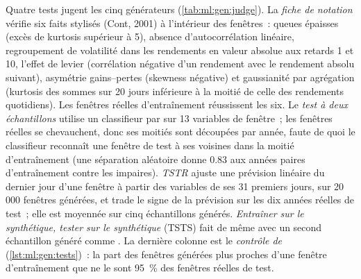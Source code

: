 Quatre tests jugent les cinq générateurs (\cref{tab:ml:gen:judge}). La \emph{fiche de notation} vérifie six faits stylisés (Cont,
2001) à l'intérieur des fenêtres~: queues épaisses (excès de kurtosis supérieur à 5), absence d'autocorrélation linéaire, regroupement de volatilité
dans les rendements en valeur absolue aux retards 1 et 10, l'effet de levier (corrélation négative d'un rendement avec le rendement absolu suivant), asymétrie gains--pertes
(skewness négative) et gaussianité par agrégation (kurtosis des sommes sur 20 jours inférieure à la moitié de celle des rendements quotidiens). Les
fenêtres réelles d'entraînement réussissent les six. Le \emph{test à deux échantillons} utilise un classifieur par  sur 13 variables de fenêtre~; les
fenêtres réelles se chevauchent, donc ses moitiés sont découpées par année, faute de quoi le classifieur reconnaît une fenêtre de test à ses voisines dans la
moitié d'entraînement (une séparation aléatoire donne 0.83 aux années paires d'entraînement contre les impaires). \emph{TSTR} ajuste une
prévision linéaire du dernier jour d'une fenêtre à partir des variables de ses 31 premiers jours, sur 20\,000 fenêtres générées, et trade le signe de la
prévision sur les dix années réelles de test~; elle est moyennée sur cinq échantillons générés. \emph{Entraîner sur le synthétique,
tester sur le synthétique} (TSTS) fait de même avec un second échantillon généré comme . La dernière colonne est le
\emph{contrôle de } (\cref{lst:ml:gen:tests})~: la part des fenêtres générées plus proches d'une fenêtre d'entraînement que
ne le sont 95~\% des fenêtres réelles de test.

